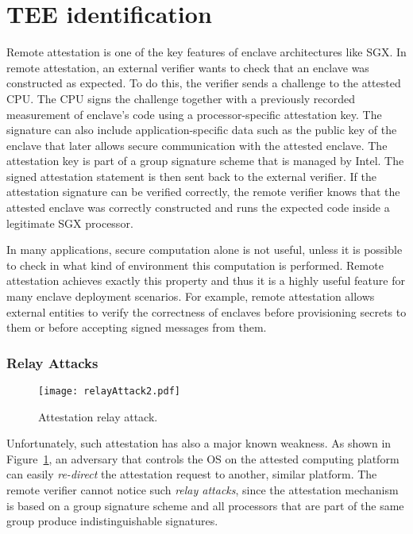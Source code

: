 
\section*{TEE identification}

Remote attestation is one of the key features of enclave architectures like SGX. In remote attestation, an external verifier wants to check that an enclave was constructed as expected. To do this, the verifier sends a challenge to the attested CPU. The CPU signs the challenge together with a previously recorded measurement of enclave's code using a processor-specific attestation key. The signature can also include application-specific data such as the public key of the enclave that later allows secure communication with the attested enclave. The attestation key is part of a group signature scheme that is managed by Intel. The signed attestation statement is then sent back to the external verifier. If the attestation signature can be verified correctly, the remote verifier knows that the attested enclave was correctly constructed and runs the expected code inside a legitimate SGX processor. 

In many applications, secure computation alone is not useful, unless it is possible to check in what kind of environment this computation is performed. Remote attestation achieves exactly this property and thus it is a highly useful feature for many enclave deployment scenarios. For example, remote attestation allows external entities to verify the correctness of enclaves before provisioning secrets to them or before accepting signed messages from them.  

\subsubsection*{Relay Attacks}

\begin{figure}[t]
	\centering
	\texttt{[image: relayAttack2.pdf]}
	\caption{Attestation relay attack.}
	\label{fig:SystemModel}
\end{figure}

Unfortunately, such attestation has also a major known weakness. As shown in Figure~\ref{fig:SystemModel}, an adversary that controls the OS on the attested computing platform can easily \emph{re-direct} the attestation request to another, similar platform. The remote verifier cannot notice such \emph{relay attacks}, since the attestation mechanism is based on a group signature scheme and all processors that are part of the same group produce indistinguishable signatures. 

